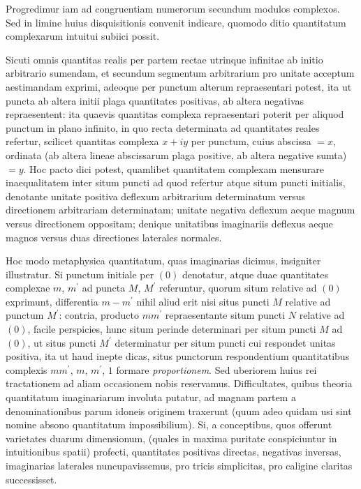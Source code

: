 \documentclass[twoside,12pt]{memoir}
\begin{document}
Progredimur iam ad congruentiam numerorum secundum modulos complexos. Sed in limine huius disquisitionis convenit indicare, quomodo ditio quantitatum complexarum intuitui subiici possit.
 
Sicuti omnis quantitas realis per partem rectae utrinque infinitae ab initio arbitrario sumendam, et secundum segmentum arbitrarium pro unitate acceptum aestimandam exprimi, adeoque per punctum alterum repraesentari potest, ita ut puncta ab altera initii plaga quantitates positivas, ab altera negativas repraesentent: ita quaevis quantitas complexa repraesentari poterit per aliquod punctum in plano infinito, in quo recta determinata ad quantitates reales refertur, scilicet quantitas complexa \(x+i y\) per punctum, cuius abscissa \(=x\), ordinata (ab altera lineae abscissarum plaga positive, ab altera negative sumta) \(=y\). Hoc pacto dici potest, quamlibet quantitatem complexam mensurare inaequalitatem inter situm puncti ad quod refertur atque situm puncti initialis, denotante unitate positiva deflexum arbitrarium determinatum versus directionem arbitrariam determinatam; unitate negativa deflexum aeque magnum versus directionem oppositam; denique unitatibus imaginariis deflexus aeque magnos versus duas directiones laterales normales.

Hoc modo metaphysica quantitatum, quas imaginarias dicimus, insigniter illustratur. Si punctum initiale per \((0)\) denotatur, atque duae quantitates complexae \(m\), \(m^{\prime}\) ad puncta \(M\), \(M^{\prime}\) referuntur, quorum situm relative ad \((0)\) exprimunt, differentia \(m-m^{\prime}\) nihil aliud erit nisi situs puncti \(M\) relative ad punctum \(M^{\prime}\): contria, producto \(m m^{\prime}\) repraesentante situm puncti \(N\) relative ad \((0)\), facile perspicies, hunc situm perinde determinari per situm puncti \(M\) ad \((0)\), ut situs puncti \(M^{\prime}\) determinatur per situm puncti cui respondet unitas positiva, ita ut haud inepte dicas, situs punctorum respondentium quantitatibus complexis \(m m^{\prime}\),\pagebreak%
\(m\), \(m^{\prime}\), \(1\) formare \textit{proportionem}. Sed uberiorem huius rei tractationem ad aliam occasionem nobis reservamus. Difficultates, quibus theoria quantitatum imaginariarum involuta putatur, ad magnam partem a denominationibus parum idoneis originem traxerunt (quum adeo quidam usi sint nomine absono quantitatum impossibilium). Si, a conceptibus, quos offerunt varietates duarum dimensionum, (quales in maxima puritate conspiciuntur in intuitionibus spatii) profecti, quantitates positivas directas, negativas inversas, imaginarias laterales nuncupavissemus, pro tricis simplicitas, pro caligine claritas successisset.
\end{document}
